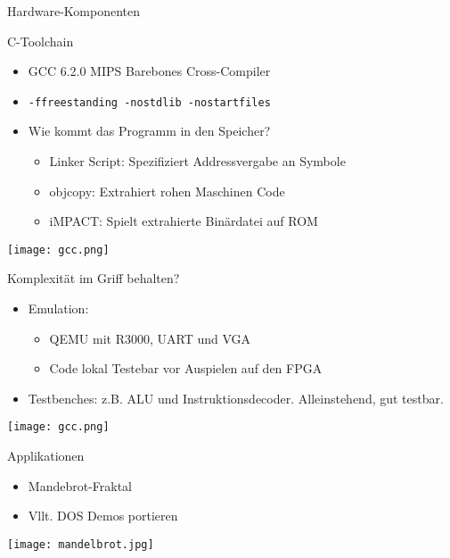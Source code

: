 \begin{frame}{Hardware-Komponenten}
\begin{frame}{C-Toolchain}

\begin{itemize}
\item GCC 6.2.0 MIPS Barebones Cross-Compiler
\item \texttt{-ffreestanding -nostdlib -nostartfiles}
\item Wie kommt das Programm in den Speicher?
\begin{itemize}
    \item Linker Script: Spezifiziert Addressvergabe an Symbole
    \item objcopy: Extrahiert rohen Maschinen Code
    \item iMPACT: Spielt extrahierte Binärdatei auf ROM
\end{itemize}
\end{itemize}
\begin{center}
\texttt{[image: gcc.png]}
\end{center}


\end{frame}

\begin{frame}{Komplexität im Griff behalten?}

\begin{itemize}
\item Emulation:
\begin{itemize}
    \item QEMU mit R3000, UART und VGA
    \item Code lokal Testebar vor Auspielen auf den FPGA
\end{itemize}
    \item Testbenches: z.B. ALU und Instruktionsdecoder. Alleinstehend, gut testbar.
\end{itemize}
\begin{center}
\texttt{[image: gcc.png]}
\end{center}


\end{frame}


\begin{frame}{Applikationen}
\begin{itemize}
\item Mandebrot-Fraktal
\item Vllt. DOS Demos portieren
\end{itemize}

\begin{center}
\texttt{[image: mandelbrot.jpg]}
\end{center}



\end{frame}
\end{frame}
